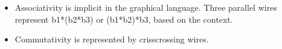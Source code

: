 \documentclass[preprint]{sigplanconf}
\begin{document}
\begin{itemize}


\item Associativity is implicit in the graphical language. Three parallel
  wires represent {{b1*(b2*b3)}} or {{(b1*b2)*b3}}, based on the context.
\begin{center}
\end{center}

\item Commutativity is represented by crisscrossing wires.
\begin{multicols}{2}
\begin{center}
\end{center}
\begin{center}
\end{center}
\end{multicols}


\end{itemize}
\end{document}
